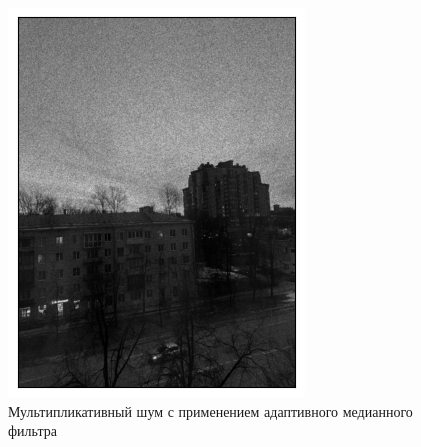 \documentclass[a4paper,12pt]{article}
\begin{document}
\begin{figure}[H]
\begin{minipage}{0.49\textwidth}
        \centering \includegraphics[width=\textwidth]{results/nlf_speckle_5.png}
        \caption{Мультипликативный шум с применением адаптивного медианного фильтра}
    \end{minipage}
\end{figure}
\end{document}

